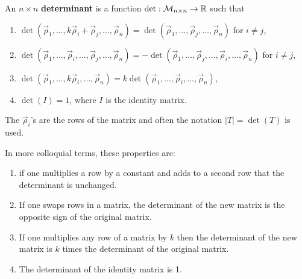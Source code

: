 \begin{definition} \label{defn:det}
An $n \times n$ \textbf{determinant} is a function $\det: {\cal M}_{n \times n} \rightarrow \mathbb{R}$ such that
%
\begin{enumerate}
\item $\det(\vec{\rho}_1,\ldots, k \vec{\rho}_i + \vec{\rho}_j, \ldots, \vec{\rho}_n) = \det(\vec{\rho}_1, \ldots, \vec{\rho}_j , \ldots, \vec{\rho}_n)$ for $i \neq j$,
\item $\det(\vec{\rho}_1,\ldots, \vec{\rho}_i, \ldots,  \vec{\rho}_j, \ldots, \vec{\rho}_n) = -\det(\vec{\rho}_1, \ldots, \vec{\rho}_j, \ldots, \vec{\rho}_i, \ldots, \vec{\rho}_n)$ for $i \neq j$,
\item $\det(\vec{\rho}_1,\ldots, k \vec{\rho}_i, \ldots, \vec{\rho}_n) = k \det(\vec{\rho}_1, \ldots, \vec{\rho}_i , \ldots, \vec{\rho}_n)$,
\item $\det(I) =1$, where $I$ is the identity matrix.
\end{enumerate}
The $\vec{\rho}_i$'s are the rows of the matrix and often the notation $|T| = \det(T)$ is used.
\end{definition}

In more colloquial terms, these properties are:

\begin{enumerate}
\item if one multiplies a row by a constant and adds to a second row that the determinant is unchanged.
\item If one swaps rows in a matrix, the determinant of the new matrix is the opposite sign of the original matrix.
\item If one multiplies any row of a matrix by $k$ then the determinant of the new matrix is $k$ times the determinant of the original matrix.
\item The determinant of the identity matrix is 1.
\end{enumerate}

